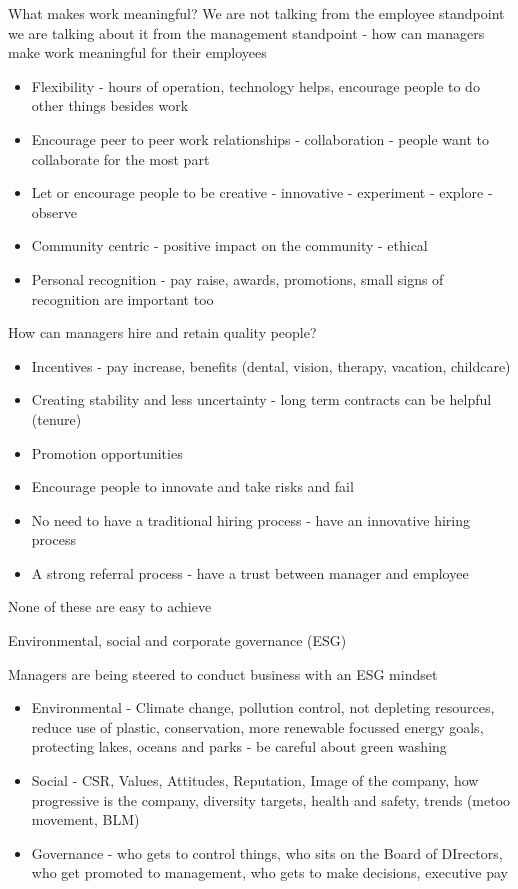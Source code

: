 \documentclass[11pt]{article}
\begin{document}
What makes work meaningful? We are not talking from the employee standpoint we are talking about it from the management standpoint - how can managers make work meaningful for their employees

\begin{itemize}
    \item Flexibility - hours of operation, technology helps, encourage people to do other things besides work
    \item Encourage peer to peer work relationships - collaboration - people want to collaborate for the most part
    \item Let or encourage people to be creative - innovative - experiment - explore - observe
    \item Community centric - positive impact on the community - ethical
    \item Personal recognition - pay raise, awards, promotions, small signs of recognition are important too
\end{itemize}


How can managers hire and retain quality people?

\begin{itemize}
    \item Incentives - pay increase, benefits (dental, vision, therapy, vacation, childcare)
    \item Creating stability and less uncertainty - long term contracts can be helpful (tenure)
    \item Promotion opportunities
    \item Encourage people to innovate and take risks and fail
    \item No need to have a traditional hiring process - have an innovative hiring process
    \item A strong referral process - have a trust between manager and employee
\end{itemize}

None of these are easy to achieve

Environmental, social and corporate governance (ESG)

Managers are being steered to conduct business with an ESG mindset

\begin{itemize}
    \item Environmental - Climate change, pollution control, not depleting resources, reduce use of plastic, conservation, more renewable focussed energy goals, protecting lakes, oceans and parks - be careful about green washing
    \item Social - CSR, Values, Attitudes, Reputation, Image of the company, how progressive is the company, diversity targets, health and safety, trends (metoo movement, BLM)
    \item Governance - who gets to control things, who sits on the Board of DIrectors, who get promoted to management, who gets to make decisions, executive pay
\end{itemize}
\end{document}

